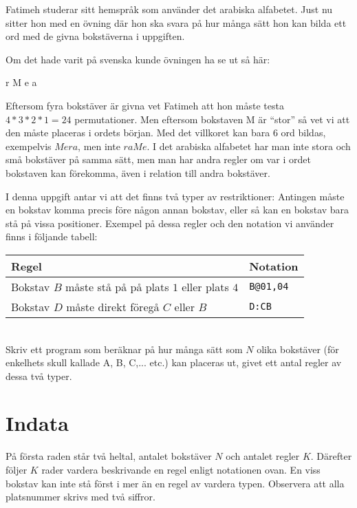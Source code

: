 
Fatimeh studerar sitt hemspråk som använder det arabiska alfabetet. Just nu
sitter hon med en övning där hon ska svara på
hur många sätt hon kan bilda ett ord med de givna bokstäverna i uppgiften.

Om det hade varit på svenska kunde övningen ha se ut så här:

\vspace{0.2in}
\centerline{r M e a}
\vspace{0.2in}

Eftersom fyra bokstäver är givna vet Fatimeh att hon måste testa $4*3*2*1 =
24$ permutationer. Men eftersom bokstaven M är ``stor'' så vet vi
att den måste placeras i ordets början. Med det villkoret kan bara $6$
ord bildas, exempelvis $Mera$, men
inte $raMe$. I det arabiska alfabetet har man inte stora och små bokstäver
på samma sätt, men man har andra regler om var
i ordet bokstaven kan förekomma, även i relation till andra
bokstäver. 

I denna uppgift antar vi att det finns två typer av restriktioner: Antingen måste en bokstav komma precis före
någon annan bokstav, eller så kan en bokstav bara stå på vissa
positioner. Exempel på dessa regler och den notation vi använder finns
i följande tabell:
\\
\begin{tabular}{|l|l|} \hline
\textbf{Regel} & \textbf{Notation} \\ \hline
Bokstav $B$ måste stå på på plats $1$ eller plats $4$ & \texttt{B@01,04}
\\ \hline
Bokstav $D$ måste direkt föregå $C$ eller $B$  & \texttt{D:CB} \\ \hline
\end{tabular}
\\
Skriv ett program som beräknar
på hur många sätt som $N$ olika bokstäver (för enkelhets skull kallade A,
B, C,... etc.) kan placeras ut, givet ett antal regler av dessa två
typer. 

\section*{Indata}

På första raden står två heltal, antalet bokstäver $N$
och antalet regler $K$. Därefter följer $K$ rader vardera beskrivande
en regel enligt notationen ovan. En viss bokstav kan inte stå först i mer än en regel av vardera typen. Observera att alla platsnummer skrivs med två siffror.


